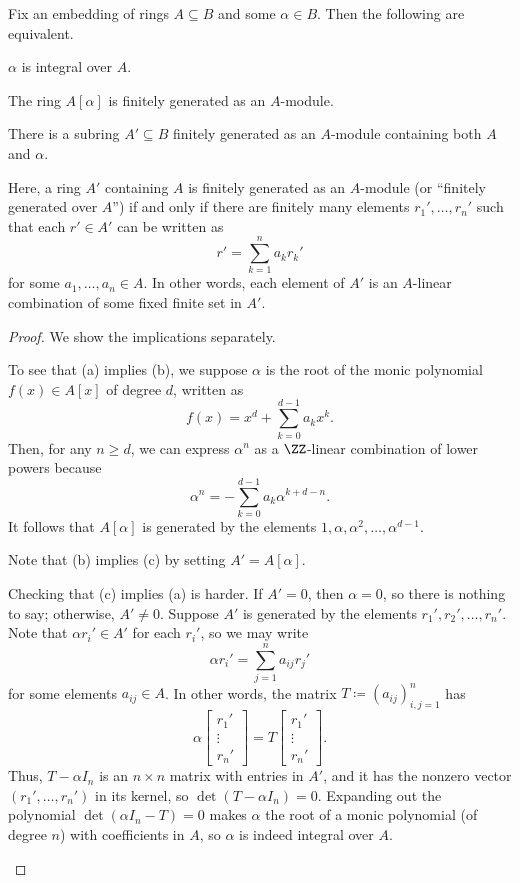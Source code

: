 \documentclass[../notes.tex]{subfiles}
\begin{document}
\begin{proposition} \label{prop:how-to-integral}
	Fix an embedding of rings $A\subseteq B$ and some $\alpha\in B$. Then the following are equivalent.
	\begin{listalph}
		\item $\alpha$ is integral over $A$.
		\item The ring $A[\alpha]$ is finitely generated as an $A$-module.
		\item There is a subring $A'\subseteq B$ finitely generated as an $A$-module containing both $A$ and $\alpha$.
	\end{listalph}
\end{proposition}
Here, a ring $A'$ containing $A$ is finitely generated as an $A$-module (or ``finitely generated over $A$'') if and only if there are finitely many elements $r_1',\ldots,r_n'$ such that each $r'\in A'$ can be written as
\[r'=\sum_{k=1}^na_kr_k'\]
for some $a_1,\ldots,a_n\in A$. In other words, each element of $A'$ is an $A$-linear combination of some fixed finite set in $A'$.
\begin{proof}
	We show the implications separately.
	\begin{listalph}
		\item To see that (a) implies (b), we suppose $\alpha$ is the root of the monic polynomial $f(x)\in A[x]$ of degree $d$, written as
		\[f(x)=x^d+\sum_{k=0}^{d-1}a_kx^k.\]
		Then, for any $n\ge d$, we can express $\alpha^n$ as a $\ZZ$-linear combination of lower powers because
		\[\alpha^n=-\sum_{k=0}^{d-1}a_k\alpha^{k+d-n}.\]
		It follows that $A[\alpha]$ is generated by the elements $1,\alpha,\alpha^2,\ldots,\alpha^{d-1}$.
		\item Note that (b) implies (c) by setting $A'=A[\alpha]$.
		\item Checking that (c) implies (a) is harder. If $A'=0$, then $\alpha=0$, so there is nothing to say; otherwise, $A'\ne0$. Suppose $A'$ is generated by the elements $r_1',r_2',\ldots,r_n'$. Note that $\alpha r_i'\in A'$ for each $r_i'$, so we may write
		\[\alpha r_i'=\sum_{j=1}^na_{ij}r_j'\]
		for some elements $a_{ij}\in A$. In other words, the matrix $T\coloneqq(a_{ij})_{i,j=1}^n$ has
		\[\alpha\begin{bmatrix}
			r_1' \\
			\vdots \\
			r_n'
		\end{bmatrix}=T\begin{bmatrix}
			r_1' \\
			\vdots \\
			r_n'
		\end{bmatrix}.\]
		Thus, $T-\alpha I_n$ is an $n\times n$ matrix with entries in $A'$, and it has the nonzero vector $(r_1',\ldots,r_n')$ in its kernel, so $\det(T-\alpha I_n)=0$. Expanding out the polynomial $\det(\alpha I_n-T)=0$ makes $\alpha$ the root of a monic polynomial (of degree $n$) with coefficients in $A$, so $\alpha$ is indeed integral over $A$.
		\qedhere
	\end{listalph}
\end{proof}
\end{document}
